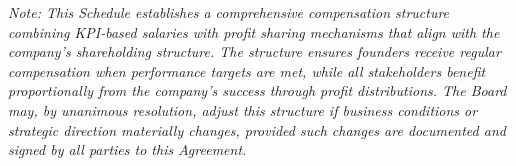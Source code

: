 \textit{Note: This Schedule establishes a comprehensive compensation structure combining KPI-based salaries with profit sharing mechanisms that align with the company's shareholding structure. The structure ensures founders receive regular compensation when performance targets are met, while all stakeholders benefit proportionally from the company's success through profit distributions. The Board may, by unanimous resolution, adjust this structure if business conditions or strategic direction materially changes, provided such changes are documented and signed by all parties to this Agreement.} 